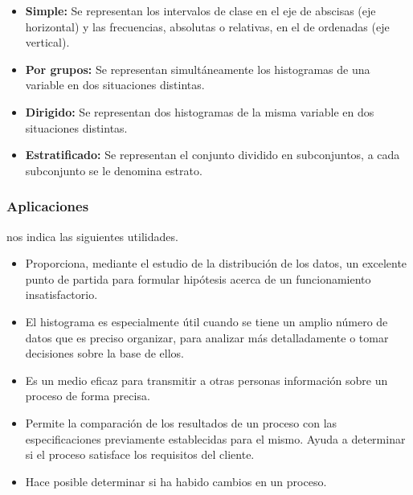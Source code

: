 \begin{itemize}
	\item \textbf{Simple:} Se representan los intervalos de clase en el eje de abscisas (eje horizontal) y las frecuencias, absolutas o relativas, en el de ordenadas (eje vertical).
	
	
	\item \textbf{Por grupos:} Se representan simultáneamente los histogramas de una variable en dos situaciones distintas.
	
	\item \textbf{Dirigido:} Se representan dos histogramas de la misma variable en dos situaciones distintas.
	
	\item \textbf{Estratificado:} Se representan el conjunto dividido en subconjuntos, a cada subconjunto se le denomina estrato.
	
\end{itemize}

\vskip 1cm 
\subsubsection{Aplicaciones}
\cite{histograma_tipos} nos indica las siguientes utilidades.
\begin{itemize}
	\item Proporciona, mediante el estudio de la distribución de los datos, un excelente punto de partida para formular hipótesis acerca de un funcionamiento insatisfactorio.
	\item El histograma es especialmente útil cuando se tiene un amplio número de datos que es preciso organizar, para analizar más detalladamente o tomar decisiones sobre la base de ellos.
	\item Es un medio eficaz para transmitir a otras personas información sobre un proceso de forma precisa.
	\item Permite la comparación de los resultados de un proceso con las especificaciones previamente establecidas para el mismo. Ayuda a determinar si el proceso satisface los requisitos del cliente.
	\item Hace posible determinar si ha habido cambios en un proceso.
	
\end{itemize}


